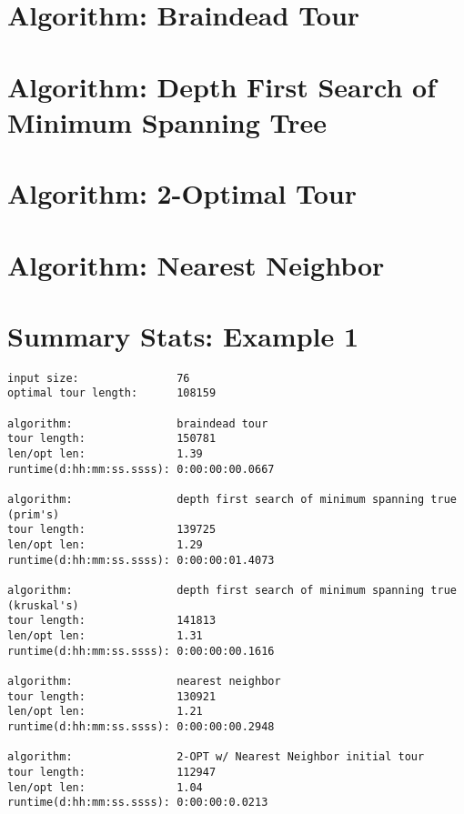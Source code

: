 \documentclass[12pt]{article}
\begin{document}
\newpage
\section*{Algorithm: Braindead Tour}


\newpage
\section*{Algorithm: Depth First Search of Minimum Spanning Tree}


\newpage
\section*{Algorithm: 2-Optimal Tour}


\newpage
\section*{Algorithm: Nearest Neighbor}


\newpage
\section*{Summary Stats: Example 1}
\begin{verbatim}
input size:               76
optimal tour length:      108159

algorithm:                braindead tour
tour length:              150781
len/opt len:              1.39
runtime(d:hh:mm:ss.ssss): 0:00:00:00.0667

algorithm:                depth first search of minimum spanning true (prim's) 
tour length:              139725
len/opt len:              1.29
runtime(d:hh:mm:ss.ssss): 0:00:00:01.4073

algorithm:                depth first search of minimum spanning true (kruskal's) 
tour length:              141813
len/opt len:              1.31
runtime(d:hh:mm:ss.ssss): 0:00:00:00.1616

algorithm:                nearest neighbor 
tour length:              130921
len/opt len:              1.21
runtime(d:hh:mm:ss.ssss): 0:00:00:00.2948

algorithm:                2-OPT w/ Nearest Neighbor initial tour
tour length:              112947
len/opt len:              1.04
runtime(d:hh:mm:ss.ssss): 0:00:00:0.0213
\end{verbatim}
\end{document}
